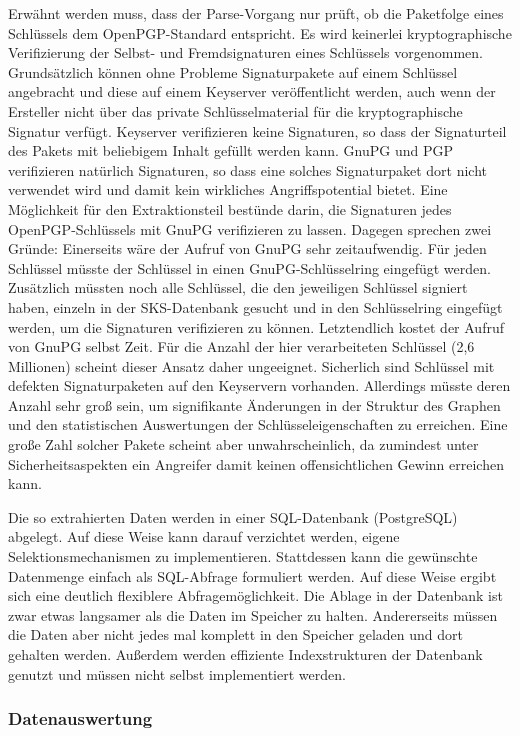 Erwähnt werden muss, dass der Parse-Vorgang nur prüft, ob die
Paketfolge eines Schlüssels dem OpenPGP-Standard entspricht. Es wird
keinerlei kryptographische Verifizierung der Selbst- und
Fremdsignaturen eines Schlüssels vorgenommen. Grundsätzlich können
ohne Probleme Signaturpakete auf einem Schlüssel angebracht und diese
auf einem Keyserver veröffentlicht werden, auch wenn der Ersteller
nicht über das private Schlüsselmaterial für die kryptographische
Signatur verfügt. Keyserver verifizieren keine Signaturen, so dass der
Signaturteil des Pakets mit beliebigem Inhalt gefüllt werden
kann. GnuPG und PGP verifizieren natürlich Signaturen, so dass eine
solches Signaturpaket dort nicht verwendet wird und damit kein
wirkliches Angriffspotential bietet. Eine Möglichkeit für den
Extraktionsteil bestünde darin, die Signaturen jedes
OpenPGP-Schlüssels mit GnuPG verifizieren zu lassen. Dagegen sprechen
zwei Gründe: Einerseits wäre der Aufruf von GnuPG sehr
zeitaufwendig. Für jeden Schlüssel müsste der Schlüssel in einen
GnuPG-Schlüsselring eingefügt werden. Zusätzlich müssten noch alle
Schlüssel, die den jeweiligen Schlüssel signiert haben, einzeln in der
SKS-Datenbank gesucht und in den Schlüsselring eingefügt werden, um
die Signaturen verifizieren zu können. Letztendlich kostet der Aufruf
von GnuPG selbst Zeit. Für die Anzahl der hier verarbeiteten Schlüssel
(2,6 Millionen) scheint dieser Ansatz daher ungeeignet. Sicherlich
sind Schlüssel mit defekten Signaturpaketen auf den Keyservern
vorhanden. Allerdings müsste deren Anzahl sehr groß sein, um
signifikante Änderungen in der Struktur des Graphen und den
statistischen Auswertungen der Schlüsseleigenschaften zu
erreichen. Eine große Zahl solcher Pakete scheint aber
unwahrscheinlich, da zumindest unter Sicherheitsaspekten ein Angreifer
damit keinen offensichtlichen Gewinn erreichen kann.

Die so extrahierten Daten werden in einer SQL-Datenbank (PostgreSQL)
abgelegt. Auf diese Weise kann darauf verzichtet werden, eigene
Selektionsmechanismen zu implementieren. Stattdessen kann die
gewünschte Datenmenge einfach als SQL-Abfrage formuliert werden. Auf
diese Weise ergibt sich eine deutlich flexiblere
Abfragemöglichkeit. Die Ablage in der Datenbank ist zwar etwas
langsamer als die Daten im Speicher zu halten. Andererseits müssen die
Daten aber nicht jedes mal komplett in den Speicher geladen und dort
gehalten werden. Außerdem werden effiziente Indexstrukturen der
Datenbank genutzt und müssen nicht selbst implementiert werden.

\subsubsection{Datenauswertung}
\label{sec:datenauswertung}


